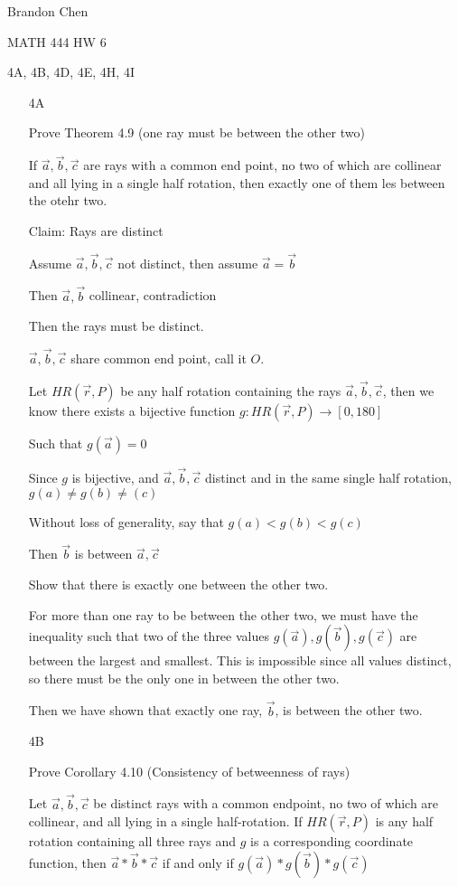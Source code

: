 \documentclass[11pt]{article}
\newcommand{\ray}[1]{\overrightarrow{#1}}
\begin{document}
\noindent Brandon Chen

\noindent MATH 444 HW 6

\noindent 4A, 4B, 4D, 4E, 4H, 4I

\begin{itemize}

	\item[4A]

		Prove Theorem 4.9 (one ray must be between the other two)

		If $\ray{a}, \ray{b}, \ray{c}$ are rays with a common end point, no two of which are collinear and all lying in a single half rotation, then exactly one of them les between the otehr two.

		Claim: Rays are distinct

		Assume $\ray{a}, \ray{b}, \ray{c}$ not distinct, then assume $\ray{a} = \ray{b}$

		Then $\ray{a},\ray{b}$ collinear, contradiction

		Then the rays must be distinct.

		$\ray{a}, \ray{b}, \ray{c}$ share common end point, call it $O$.

		Let $HR(\ray{r}, P)$ be any half rotation containing the rays $\ray{a}, \ray{b}, \ray{c}$, then we know there exists a bijective function $g:HR(\ray{r}, P) \rightarrow [0,180]$

		Such that $g(\ray{a}) = 0$

		Since $g$ is bijective, and $\ray{a},\ray{b},\ray{c}$ distinct and in the same single half rotation, $g(a) \neq g(b) \neq(c)$

		Without loss of generality, say that $g(a) < g(b) < g(c)$

		Then $\ray{b}$ is between $\ray{a}, \ray{c}$

		Show that there is exactly one between the other two.

		For more than one ray to be between the other two, we must have the inequality such that two of the three values $g(\ray{a}), g(\ray{b}), g(\ray{c})$ are between the largest and smallest. This is impossible since all values distinct, so there must be the only one in between the other two.

		Then we have shown that exactly one ray, $\ray{b}$, is between the other two.

	\item[4B]

		Prove Corollary 4.10 (Consistency of betweenness of rays)

		Let $\ray{a}, \ray{b}, \ray{c}$ be distinct rays with a common endpoint, no two of which are collinear, and all lying in a single half-rotation. If $HR(\ray{r}, P)$ is any half rotation containing all three rays and $g$ is a corresponding coordinate function, then $\ray{a} * \ray{b} * \ray{c}$ if and only if $g(\ray{a}) * g(\ray{b}) * g(\ray{c})$


\end{itemize}
\end{document}

